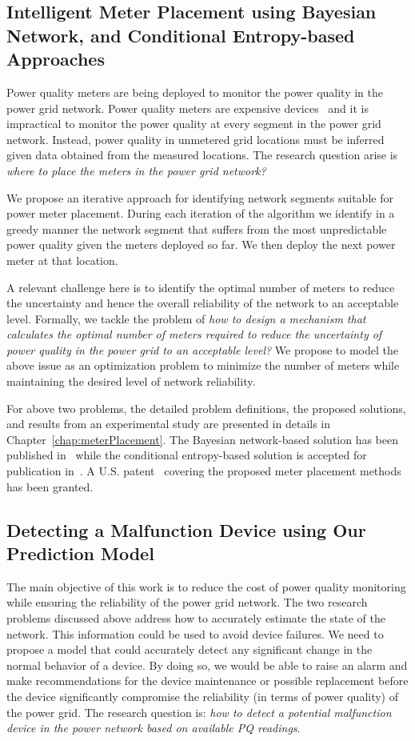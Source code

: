 \subsection{Intelligent Meter Placement using Bayesian Network, and Conditional Entropy-based Approaches}
Power quality meters are being deployed to monitor the power quality in the power grid network. Power quality meters are expensive devices~\cite{fluke_meter, schneider_meter} and it is impractical to monitor the power quality at every segment in the power grid network. Instead, power quality in unmetered grid locations must be inferred given data obtained from the measured locations. The research question arise is \textit{where to place the meters in the power grid network?}
	
We propose an iterative approach for identifying network segments suitable for power meter placement. During each iteration of the algorithm we identify in a greedy manner the network segment that suffers from the most unpredictable power quality given the meters deployed so far. We then deploy the next power meter at that location.

A relevant challenge here is to identify the optimal number of meters to reduce the uncertainty and hence the overall reliability of the network to an acceptable level. Formally, we tackle the problem of \textit{how to design a mechanism that calculates the optimal number of meters required to reduce the uncertainty of power quality in the power grid to an acceptable level?} We propose to model the above issue as an optimization problem to minimize the number of meters while maintaining the desired level of network reliability.

For above two problems, the detailed problem definitions, the proposed solutions, and results from an experimental study are presented in details in Chapter~\ref{chap:meterPlacement}. The Bayesian network-based solution has been published in~\cite{ali2013intelligent} while the conditional entropy-based solution is accepted for publication in~\cite{alimachine}. A U.S. patent~\cite{marinakis2014systems} covering the proposed meter placement methods has been granted.

\subsection{Detecting a Malfunction Device using Our Prediction Model}
The main objective of this work is to reduce the cost of power quality monitoring while ensuring the reliability of the power grid network. The two research problems discussed above address how to accurately estimate the state of the network. This information could be used to avoid device failures. We need to propose a model that could accurately detect any significant change in the normal behavior of a device. By doing so, we would be able to raise an alarm and make recommendations for the device maintenance or possible replacement before the device significantly compromise the reliability (in terms of power quality) of the power grid. The research question is: \textit{how to detect a potential malfunction device in the power network based on available PQ readings}.

